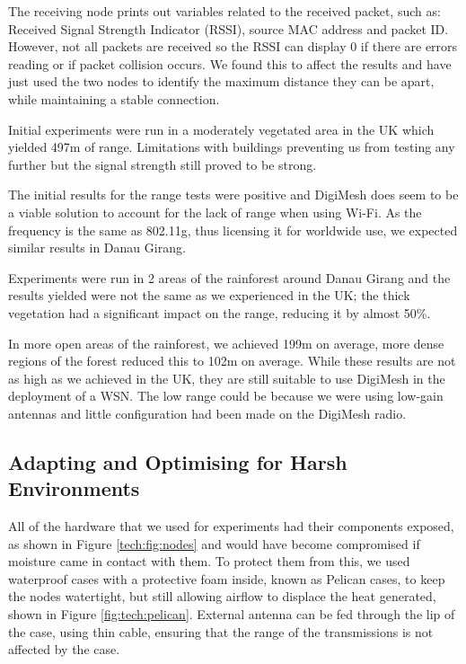 The receiving node prints out variables related to the received packet, such as: Received Signal Strength Indicator (RSSI), source MAC address and packet ID. However, not all packets are received so the RSSI can display 0 if there are errors reading or if packet collision occurs. We found this to affect the results and have just used the two nodes to identify the maximum distance they can be apart, while maintaining a stable connection.
					
Initial experiments were run in a moderately vegetated area in the UK which yielded 497m of range. Limitations with buildings preventing us from testing any further but the signal strength still proved to be strong.
			
The initial results for the range tests were positive and DigiMesh does seem to be a viable solution to account for the lack of range when using Wi-Fi. As the frequency is the same as 802.11g, thus licensing it for worldwide use, we expected similar results in Danau Girang.
						
Experiments were run in 2 areas of the rainforest around Danau Girang and the results yielded were not the same as we experienced in the UK; the thick vegetation had a significant impact on the range, reducing it by almost 50\%.
			
In more open areas of the rainforest, we achieved 199m on average, more dense regions of the forest reduced this to 102m on average. While these results are not as high as we achieved in the UK, they are still suitable to use DigiMesh in the deployment of a WSN. The low range could be because we were using low-gain antennas and little configuration had been made on the DigiMesh radio.

\subsection{Adapting and Optimising for Harsh Environments}
	All of the hardware that we used for experiments had their components exposed, as shown in Figure \ref{tech:fig:nodes} and would have become compromised if moisture came in contact with them. To protect them from this, we used waterproof cases with a protective foam inside, known as Pelican cases, to keep the nodes watertight, but still allowing airflow to displace the heat generated, shown in Figure \ref{fig:tech:pelican}.
	External antenna can be fed through the lip of the case, using thin cable, ensuring that the range of the transmissions is not affected by the case. 

